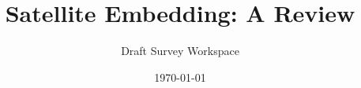 \documentclass[11pt]{article}
\title{Satellite Embedding: A Review}
\author{Draft Survey Workspace}
\date{\today}
\begin{document}
\maketitle

\begin{abstract}

\end{abstract}









\appendix




\end{document}
